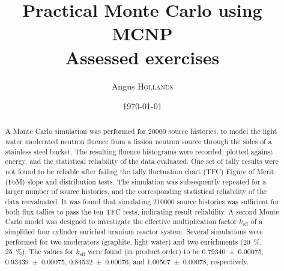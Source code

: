 \documentclass{article}
\title{Practical Monte Carlo using MCNP \\ Assessed exercises} %
\author{Angus \textsc{Hollands}} %
\date{\today} %
\begin{document}
\maketitle %



\begin{abstract}
  A Monte Carlo simulation was performed for \num{20000} source histories, to model the light water moderated neutron fluence from a fission neutron source through the sides of a stainless steel bucket. The resulting fluence histograms were recorded, plotted against energy, and the statistical reliability of the data evaluated. One set of tally results were not found to be reliable after failing the tally fluctuation chart (TFC) Figure of Merit (FoM) slope and distribution tests. The simulation was subsequently repeated for a larger number of source histories, and the corresponding statistical reliability of the data re\textendash evaluated. It was found that simulating \num{210000} source histories was sufficient for both flux tallies to pass the ten TFC tests, indicating result reliability.
  A second Monte Carlo model was designed to investigate the effective multiplication factor $k_{\text{eff}}$ of a simplified four cylinder enriched uranium reactor system. Several simulations were performed for two moderators (graphite, light water) and two enrichments (\SI{20}{\percent}, \SI{25}{\percent}). The values for $k_{\text{eff}}$ were found (in product order) to be \num{0.79340 \pm 0.00075}, \num{0.93439 \pm 0.00075}, \num{0.84532 \pm 0.00076}, and \num{1.00507 \pm 0.00078}, respectively.
\end{abstract}
\end{document}
